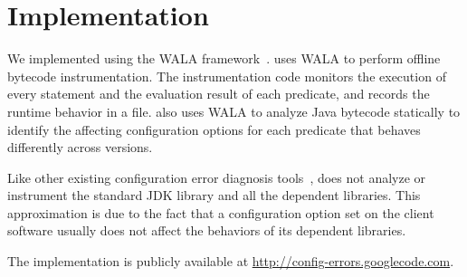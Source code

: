 \section{Implementation}
\label{sec:implementation}

We implemented \ourtool using the WALA
framework~\cite{wala}. \ourtool uses WALA to perform offline
bytecode instrumentation. The instrumentation code
monitors the execution of every statement and the evaluation
result of each predicate, and records the runtime behavior
in a file. \ourtool also uses WALA
to analyze Java bytecode statically to
identify the affecting configuration options
for each predicate that behaves differently across versions.

Like other existing configuration error
diagnosis tools~\cite{Rabkin:2011:PPC, Zhang:2013:ADS}, \ourtool does not 
analyze or instrument the standard JDK library and
all the dependent libraries. This approximation
is due to the fact that a configuration
option set on the client software usually
does not affect the behaviors of its dependent libraries.

The \ourtool implementation is publicly available at
\url{http://config-errors.googlecode.com}.
